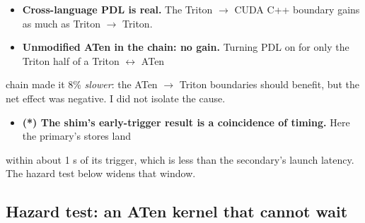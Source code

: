 \documentclass[10pt]{article}
\begin{document}
\begin{table}[H]\centering\small
{}
\end{table}

\begin{itemize}
\item \textbf{Cross-language PDL is real.} The Triton $\rightarrow$ CUDA C++ boundary gains as much as Triton $\rightarrow$ Triton.
\item \textbf{Unmodified ATen in the chain: no gain.} Turning PDL on for only the Triton half of a Triton $\leftrightarrow$ ATen
\end{itemize}
chain made it 8\% \emph{slower}: the ATen $\rightarrow$ Triton boundaries should benefit, but the net effect was negative. I did not isolate the cause.

\begin{itemize}
\item \textbf{(*) The shim's early-trigger result is a coincidence of timing.} Here the primary's stores land
\end{itemize}
within about 1 \textmu{}s of its trigger, which is less than the secondary's launch latency. The hazard test below widens that window.


\subsection{Hazard test: an ATen kernel that cannot wait}
\end{document}
